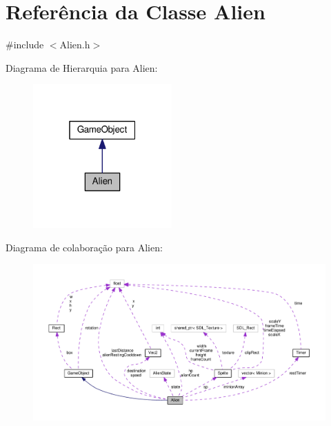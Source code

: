 \hypertarget{classAlien}{\section{Referência da Classe Alien}
\label{classAlien}
}


{\ttfamily \#include $<$Alien.\+h$>$}



Diagrama de Hierarquia para Alien\+:\nopagebreak
\begin{figure}[H]
\begin{center}
\leavevmode
\includegraphics[width=151pt]{classAlien__inherit__graph}
\end{center}
\end{figure}


Diagrama de colaboração para Alien\+:
\nopagebreak
\begin{figure}[H]
\begin{center}
\leavevmode
\includegraphics[width=350pt]{classAlien__coll__graph}
\end{center}
\end{figure}
